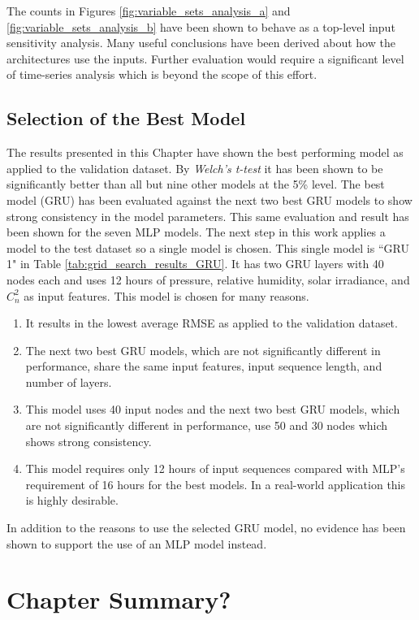 The counts in Figures \ref{fig:variable_sets_analysis_a} and \ref{fig:variable_sets_analysis_b} have been shown to behave as a top-level input sensitivity analysis. Many useful conclusions have been derived about how the architectures use the inputs. Further evaluation would require a significant level of time-series analysis which is beyond the scope of this effort.

\subsection{Selection of the Best Model}
The results presented in this Chapter have shown the best performing model as applied to the validation dataset. By \textit{Welch's t-test} it has been shown to be significantly better than all but nine other models at the 5\% level. The best model (GRU) has been evaluated against the next two best GRU models to show strong consistency in the model parameters. This same evaluation and result has been shown for the seven MLP models. The next step in this work applies a model to the test dataset so a single model is chosen. This single model is ``GRU 1" in Table \ref{tab:grid_search_results_GRU}. It has two GRU layers with 40 nodes each and uses 12 hours of pressure, relative humidity, solar irradiance, and $C_{n}^{2}$ as input features. This model is chosen for many reasons.
\begin{enumerate}
	\item It results in the lowest average RMSE as applied to the validation dataset.
	\item The next two best GRU models, which are not significantly different in performance, share the same input features, input sequence length, and number of layers.
	\item This model uses 40 input nodes and the next two best GRU models, which are not significantly different in performance, use 50 and 30 nodes which shows strong consistency.
	\item This model requires only 12 hours of input sequences compared with MLP's requirement of 16 hours for the best models. In a real-world application this is highly desirable.
\end{enumerate}
In addition to the reasons to use the selected GRU model, no evidence has been shown to support the use of an MLP model instead.

\section{Chapter Summary?}